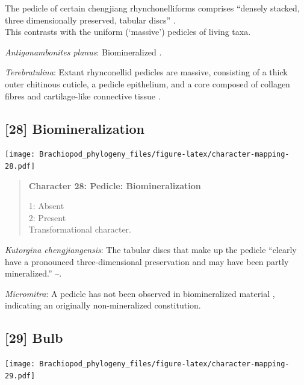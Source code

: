 \documentclass[openany]{book}
\begin{document}
The pedicle of certain chengjiang rhynchonelliforms comprises ``densely
stacked, three dimensionally preserved, tabular discs''
\citep{Holmer2018Evolutionarysignificance}.\\
This contrasts with the uniform (`massive') pedicles of living taxa.

\hypertarget{Antigonambonites_planus-coding-27}{}
\emph{Antigonambonites planus}: Biomineralized
\citep{Holmer2018Evolutionarysignificance}.

\hypertarget{Terebratulina-coding-27}{}
\emph{Terebratulina}: Extant rhynconellid pedicles are massive,
consisting of a thick outer chitinous cuticle, a pedicle epithelium, and
a core composed of collagen fibres and cartilage-like connective tissue
\citep{Holmer2018Evolutionarysignificance}.

\subsection*{{[}28{]} Biomineralization}\label{biomineralization}

\texttt{[image: Brachiopod\_phylogeny\_files/figure-latex/character-mapping-28.pdf]}

\begin{quote}
\textbf{Character 28: Pedicle: Biomineralization}

1: Absent\\
2: Present\\
Transformational character.
\end{quote}

\hypertarget{Kutorgina_chengjiangensis-coding-28}{}
\emph{Kutorgina chengjiangensis}: The tabular discs that make up the
pedicle ``clearly have a pronounced three-dimensional preservation and
may have been partly mineralized.'' --\citet{Holmer2018Theattachment}.

\hypertarget{Micromitra-coding-28}{}
\emph{Micromitra}: A pedicle has not been observed in biomineralized
material \citep{Williams1998Thediversity}, indicating an originally
non-mineralized constitution.

\subsection*{{[}29{]} Bulb}\label{bulb}

\texttt{[image: Brachiopod\_phylogeny\_files/figure-latex/character-mapping-29.pdf]}
\end{document}
